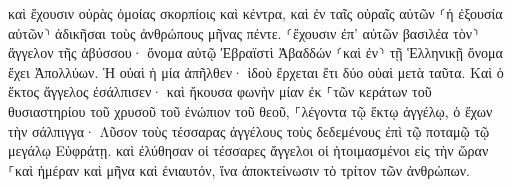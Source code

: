 \documentclass{openreader}
\begin{document}
καὶ ἔχουσιν οὐρὰς ὁμοίας σκορπίοις καὶ κέντρα, καὶ ἐν ταῖς οὐραῖς αὐτῶν ⸂ἡ ἐξουσία αὐτῶν⸃ ἀδικῆσαι τοὺς ἀνθρώπους μῆνας πέντε. 
⸂ἔχουσιν ἐπ’ αὐτῶν βασιλέα τὸν⸃ ἄγγελον τῆς ἀβύσσου· ὄνομα αὐτῷ Ἑβραϊστὶ Ἀβαδδών ⸂καὶ ἐν⸃ τῇ Ἑλληνικῇ ὄνομα ἔχει Ἀπολλύων. 
Ἡ οὐαὶ ἡ μία ἀπῆλθεν· ἰδοὺ ἔρχεται ἔτι δύο οὐαὶ μετὰ ταῦτα. 
Καὶ ὁ ἕκτος ἄγγελος ἐσάλπισεν· καὶ ἤκουσα φωνὴν μίαν ἐκ ⸀τῶν κεράτων τοῦ θυσιαστηρίου τοῦ χρυσοῦ τοῦ ἐνώπιον τοῦ θεοῦ, 
⸀λέγοντα τῷ ἕκτῳ ἀγγέλῳ, ὁ ἔχων τὴν σάλπιγγα· Λῦσον τοὺς τέσσαρας ἀγγέλους τοὺς δεδεμένους ἐπὶ τῷ ποταμῷ τῷ μεγάλῳ Εὐφράτῃ. 
καὶ ἐλύθησαν οἱ τέσσαρες ἄγγελοι οἱ ἡτοιμασμένοι εἰς τὴν ὥραν ⸀καὶ ἡμέραν καὶ μῆνα καὶ ἐνιαυτόν, ἵνα ἀποκτείνωσιν τὸ τρίτον τῶν ἀνθρώπων. 
\end{document}
